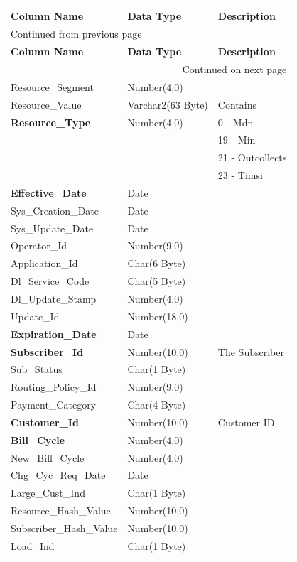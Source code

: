 \documentclass[12pt,twoside]{article}
\begin{document}
\begin{longtable}{l|l|l}
\hline
\textbf{Column Name} & \textbf{Data Type} & \textbf{Description}\\
\hline
\endfirsthead
\multicolumn{3}{l}{Continued from previous page} \\
\hline

\textbf{Column Name} & \textbf{Data Type} & \textbf{Description} \\

\hline
\endhead
\hline\multicolumn{3}{r}{Continued on next page} \\
\endfoot
\endlastfoot
\hline
Resource\_Segment & Number(4,0) & \\
Resource\_Value & Varchar2(63 Byte) & Contains\\
\textbf{Resource\_Type} & Number(4,0) & 0 - Mdn\\
&  & 19 - Min\\
&  & 21 - Outcollects\\
&  & 23 - Timsi\\
\textbf{Effective\_Date} & Date & \\
Sys\_Creation\_Date & Date & \\
Sys\_Update\_Date & Date & \\
Operator\_Id & Number(9,0) & \\
Application\_Id & Char(6 Byte) & \\
Dl\_Service\_Code & Char(5 Byte) & \\
Dl\_Update\_Stamp & Number(4,0) & \\
Update\_Id & Number(18,0) & \\
\textbf{Expiration\_Date} & Date & \\
\textbf{Subscriber\_Id} & Number(10,0) & The Subscriber\\
Sub\_Status & Char(1 Byte) & \\
Routing\_Policy\_Id & Number(9,0) & \\
Payment\_Category & Char(4 Byte) & \\
\textbf{Customer\_Id} & Number(10,0) & Customer ID\\
\textbf{Bill\_Cycle} & Number(4,0) & \\
New\_Bill\_Cycle & Number(4,0) & \\
Chg\_Cyc\_Req\_Date & Date & \\
Large\_Cust\_Ind & Char(1 Byte) & \\
Resource\_Hash\_Value & Number(10,0) & \\
Subscriber\_Hash\_Value & Number(10,0) & \\
Load\_Ind & Char(1 Byte) & \\
\hline
\end{longtable}
\end{document}
